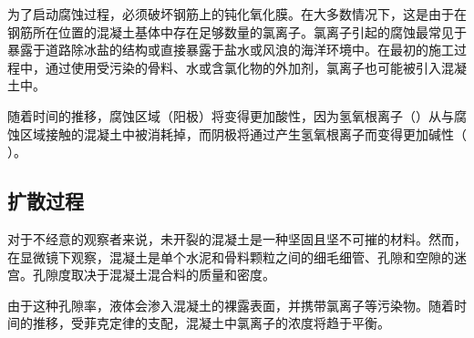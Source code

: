 为了启动腐蚀过程，必须破坏钢筋上的钝化氧化膜。在大多数情况下，这是由于在钢筋所在位置的混凝土基体中存在足够数量的氯离子。氯离子引起的腐蚀最常见于暴露于道路除冰盐的结构或直接暴露于盐水或风浪的海洋环境中。在最初的施工过程中，通过使用受污染的骨料、水或含氯化物的外加剂，氯离子也可能被引入混凝土中。

随着时间的推移，腐蚀区域（阳极）将变得更加酸性，因为氢氧根离子（）从与腐蚀区域接触的混凝土中被消耗掉，而阴极将通过产生氢氧根离子而变得更加碱性（ ）。

\subsection{扩散过程}
对于不经意的观察者来说，未开裂的混凝土是一种坚固且坚不可摧的材料。然而，在显微镜下观察，混凝土是单个水泥和骨料颗粒之间的细毛细管、孔隙和空隙的迷宫。孔隙度取决于混凝土混合料的质量和密度。

由于这种孔隙率，液体会渗入混凝土的裸露表面，并携带氯离子等污染物。随着时间的推移，受菲克定律的支配，混凝土中氯离子的浓度将趋于平衡。

